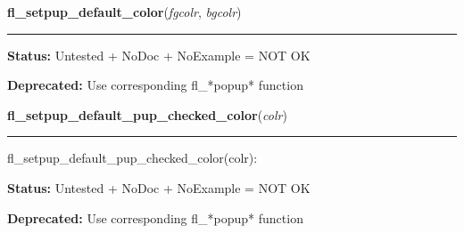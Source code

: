     \label{xformslib:library:fl_setpup_default_color}

    \vspace{0.5ex}

\hspace{.8\funcindent}\begin{boxedminipage}{\funcwidth}

    \raggedright \textbf{fl\_setpup\_default\_color}(\textit{fgcolr}, \textit{bgcolr})

    \vspace{-1.5ex}

    \rule{\textwidth}{0.5\fboxrule}
\setlength{\parskip}{2ex}
\setlength{\parskip}{1ex}
\textbf{Status:} Untested + NoDoc + NoExample = NOT OK



\textbf{Deprecated:} Use corresponding fl\_*popup* function



    \end{boxedminipage}

    \label{xformslib:library:fl_setpup_default_pup_checked_color}

    \vspace{0.5ex}

\hspace{.8\funcindent}\begin{boxedminipage}{\funcwidth}

    \raggedright \textbf{fl\_setpup\_default\_pup\_checked\_color}(\textit{colr})

    \vspace{-1.5ex}

    \rule{\textwidth}{0.5\fboxrule}
\setlength{\parskip}{2ex}
    fl\_setpup\_default\_pup\_checked\_color(colr):

\setlength{\parskip}{1ex}
\textbf{Status:} Untested + NoDoc + NoExample = NOT OK



\textbf{Deprecated:} Use corresponding fl\_*popup* function



    \end{boxedminipage}

    \label{xformslib:library:fl_setpup_default_fontsize}

